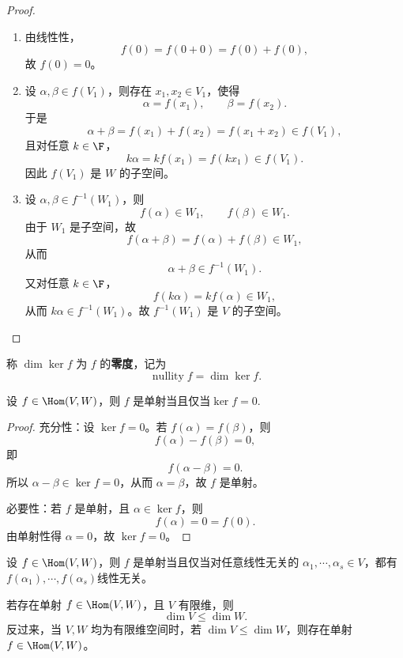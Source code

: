 \begin{proof}
	\begin{enumerate}
		\item 由线性性，
		\[
		f(0)=f(0+0)=f(0)+f(0),
		\]
		故 $f(0)=0$。
		
		\item 设 $\alpha,\beta\in f(V_1)$，则存在 $x_1,x_2\in V_1$，使得
		\[
		\alpha=f(x_1),
		\qquad
		\beta=f(x_2).
		\]
		于是
		\[
		\alpha+\beta=f(x_1)+f(x_2)=f(x_1+x_2)\in f(V_1),
		\]
		且对任意 $k\in\F$，
		\[
		k\alpha=kf(x_1)=f(kx_1)\in f(V_1).
		\]
		因此 $f(V_1)$ 是 $W$ 的子空间。
		
		\item 设 $\alpha,\beta\in f^{-1}(W_1)$，则
		\[
		f(\alpha)\in W_1,
		\qquad
		f(\beta)\in W_1.
		\]
		由于 $W_1$ 是子空间，故
		\[
		f(\alpha+\beta)=f(\alpha)+f(\beta)\in W_1,
		\]
		从而
		\[
		\alpha+\beta\in f^{-1}(W_1).
		\]
		又对任意 $k\in\F$，
		\[
		f(k\alpha)=k f(\alpha)\in W_1,
		\]
		从而 $k\alpha\in f^{-1}(W_1)$。故 $f^{-1}(W_1)$ 是 $V$ 的子空间。
	\end{enumerate}
\end{proof}

\begin{definition}
	称 $\dim\ker f$ 为 $f$ 的\textbf{零度}，记为
	\[
	\operatorname{nullity}f=\dim\ker f.
	\]
\end{definition}

\begin{proposition}
	设 $f\in\Hom(V,W)$，则 $f$ 是单射当且仅当$ \ker f=0.$
\end{proposition}

\begin{proof}
	充分性：设 $\ker f=0$。若 $f(\alpha)=f(\beta)$，则
	\[
	f(\alpha)-f(\beta)=0,
	\]
	即
	\[
	f(\alpha-\beta)=0.
	\]
	所以 $\alpha-\beta\in\ker f=0$，从而 $\alpha=\beta$，故 $f$ 是单射。
	
	必要性：若 $f$ 是单射，且 $\alpha\in\ker f$，则
	\[
	f(\alpha)=0=f(0).
	\]
	由单射性得 $\alpha=0$，故 $\ker f=0$。
\end{proof}

\begin{corollary}
	设 $f\in\Hom(V,W)$，则 $f$ 是单射当且仅当对任意线性无关的
	$\alpha_1,\cdots,\alpha_s\in V$，都有$f(\alpha_1),\cdots,f(\alpha_s) $线性无关。
\end{corollary}
\begin{corollary}
	若存在单射 $f\in\Hom(V,W)$，且 $V$ 有限维，则
	\[
	\dim V\leq \dim W.
	\]
	反过来，当 $V,W$ 均为有限维空间时，若 $\dim V\leq \dim W$，则存在单射
	$f\in\Hom(V,W)$。
\end{corollary}

